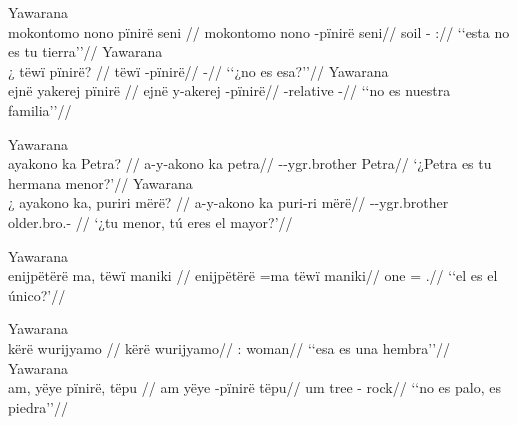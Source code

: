 \documentclass{memoir}
\begin{document}
\pex\label{id-main-neg-npred-pinire-nsubj}    \a Yawarana\\
    \label{convamgu-42}        \begingl
        \glpreamble mokontomo nono pïnirë seni //
        \gla mokontomo nono -pïnirë seni//
        \glb {} soil - ://
            \glft ‘‘esta no es tu tierra’’//  
        \endgl 
    \a Yawarana\\
    \label{histpajirdi-84}        \begingl
        \glpreamble ¿ tëwï pïnirë? //
        \gla tëwï -pïnirë//
        \glb {} -//
            \glft ‘‘¿no es esa?’’//  
        \endgl 
    \a Yawarana\\
    \label{histyarirdi-312}        \begingl
        \glpreamble ejnë yakerej pïnirë //
        \gla ejnë y-akerej -pïnirë//
        \glb {} -relative -//
            \glft ‘‘no es nuestra familia’’//  
        \endgl 
\xe

\pex\label{id-main-q-npred-nsubj}    \a Yawarana\\
    \label{convamgu-94}        \begingl
        \glpreamble ayakono ka Petra? //
        \gla a-y-akono ka petra//
        \glb {}--ygr.brother  Petra//
            \glft ‘¿Petra es tu hermana menor?’//  
        \endgl 
    \a Yawarana\\
    \label{convamgu-95}        \begingl
        \glpreamble ¿ ayakono ka, puriri mërë? //
        \gla a-y-akono ka puri-ri mërë//
        \glb {}--ygr.brother  older.bro.- //
            \glft ‘¿tu menor, tú eres el mayor?’//  
        \endgl 
\xe

\ex Yawarana \\
\label{id-main-q-npred-nsubj-maniki}    \begingl
    \glpreamble enijpëtërë ma, tëwï maniki //
    \gla enijpëtërë =ma tëwï maniki//
    \glb one =  .//
        \glft ‘‘el es el único?’//  
    \endgl 
\xe

\pex\label{cat-main-aff-npred-nsubj}    \a Yawarana\\
    \label{hist2mape-21}        \begingl
        \glpreamble kërë wurijyamo //
        \gla kërë wurijyamo//
        \glb {}: woman//
            \glft ‘‘esa es una hembra’’//  
        \endgl 
    \a Yawarana\\
    \label{histyarirdi-623}        \begingl
        \glpreamble am, yëye pïnirë, tëpu //
        \gla am yëye -pïnirë tëpu//
        \glb um tree - rock//
            \glft ‘‘no es palo, es piedra’’//  
        \endgl 
\xe
\end{document}
